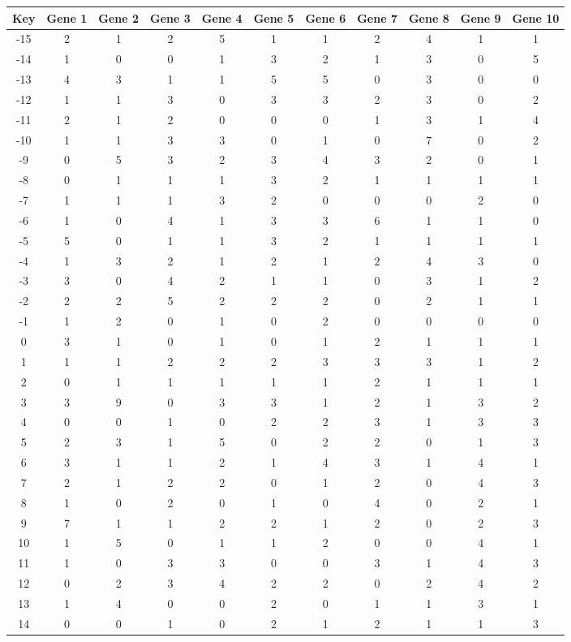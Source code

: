 \begin{tabular}{|c|c|c|c|c|c|c|c|c|c|c|}
\hline
Key & Gene 1 & Gene 2 & Gene 3 & Gene 4 & Gene 5 & Gene 6 & Gene 7 & Gene 8 & Gene 9 & Gene 10 \\
\hline
-15 & 2 & 1 & 2 & 5 & 1 & 1 & 2 & 4 & 1 & 1 \\
-14 & 1 & 0 & 0 & 1 & 3 & 2 & 1 & 3 & 0 & 5 \\
-13 & 4 & 3 & 1 & 1 & 5 & 5 & 0 & 3 & 0 & 0 \\
-12 & 1 & 1 & 3 & 0 & 3 & 3 & 2 & 3 & 0 & 2 \\
-11 & 2 & 1 & 2 & 0 & 0 & 0 & 1 & 3 & 1 & 4 \\
-10 & 1 & 1 & 3 & 3 & 0 & 1 & 0 & 7 & 0 & 2 \\
-9 & 0 & 5 & 3 & 2 & 3 & 4 & 3 & 2 & 0 & 1 \\
-8 & 0 & 1 & 1 & 1 & 3 & 2 & 1 & 1 & 1 & 1 \\
-7 & 1 & 1 & 1 & 3 & 2 & 0 & 0 & 0 & 2 & 0 \\
-6 & 1 & 0 & 4 & 1 & 3 & 3 & 6 & 1 & 1 & 0 \\
-5 & 5 & 0 & 1 & 1 & 3 & 2 & 1 & 1 & 1 & 1 \\
-4 & 1 & 3 & 2 & 1 & 2 & 1 & 2 & 4 & 3 & 0 \\
-3 & 3 & 0 & 4 & 2 & 1 & 1 & 0 & 3 & 1 & 2 \\
-2 & 2 & 2 & 5 & 2 & 2 & 2 & 0 & 2 & 1 & 1 \\
-1 & 1 & 2 & 0 & 1 & 0 & 2 & 0 & 0 & 0 & 0 \\
0 & 3 & 1 & 0 & 1 & 0 & 1 & 2 & 1 & 1 & 1 \\
1 & 1 & 1 & 2 & 2 & 2 & 3 & 3 & 3 & 1 & 2 \\
2 & 0 & 1 & 1 & 1 & 1 & 1 & 2 & 1 & 1 & 1 \\
3 & 3 & 9 & 0 & 3 & 3 & 1 & 2 & 1 & 3 & 2 \\
4 & 0 & 0 & 1 & 0 & 2 & 2 & 3 & 1 & 3 & 3 \\
5 & 2 & 3 & 1 & 5 & 0 & 2 & 2 & 0 & 1 & 3 \\
6 & 3 & 1 & 1 & 2 & 1 & 4 & 3 & 1 & 4 & 1 \\
7 & 2 & 1 & 2 & 2 & 0 & 1 & 2 & 0 & 4 & 3 \\
8 & 1 & 0 & 2 & 0 & 1 & 0 & 4 & 0 & 2 & 1 \\
9 & 7 & 1 & 1 & 2 & 2 & 1 & 2 & 0 & 2 & 3 \\
10 & 1 & 5 & 0 & 1 & 1 & 2 & 0 & 0 & 4 & 1 \\
11 & 1 & 0 & 3 & 3 & 0 & 0 & 3 & 1 & 4 & 3 \\
12 & 0 & 2 & 3 & 4 & 2 & 2 & 0 & 2 & 4 & 2 \\
13 & 1 & 4 & 0 & 0 & 2 & 0 & 1 & 1 & 3 & 1 \\
14 & 0 & 0 & 1 & 0 & 2 & 1 & 2 & 1 & 1 & 3 \\
\hline
\end{tabular}